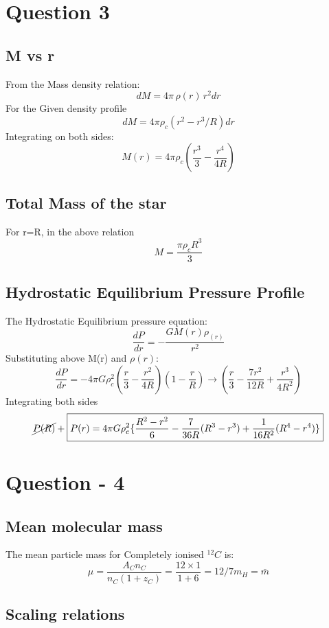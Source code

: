 \documentclass[11pt]{article}
\begin{document}
	\section{\color{teal} Question 3}
	
	\subsection{M vs r}
	
	From the Mass density relation:
	\[
		dM = 4\pi \, \rho(r)\,  r^2 dr
	\]
	For the Given density profile
	\[
		dM =4\pi\rho_c(r^2 - r^3/R)dr
	\]
	Integrating on both sides:
	\[
		\boxed{M(r) = 4\pi\rho_c (\frac{r^3}{3} -\frac{r^4}{4R})}
	\]
	\subsection{Total Mass of the star}
	
	For r=R, in the above relation
	\[
		\boxed{M = \frac{\pi\rho_cR^3}{3}}
	\]
	\subsection{Hydrostatic Equilibrium Pressure Profile}
	
	The Hydrostatic Equilibrium pressure equation:
	\[
		\frac{dP}{dr}  = -\frac{GM(r)\rho_(r)}{r^2}
	\]
	Substituting above M(r) and $\rho(r)$:
	\[
		\frac{dP}{dr} = -4\pi G \rho_c^2 (\frac{r}{3} - \frac{r^2}{4R})(1-\frac{r}{R}) \rightarrow (\frac{r}{3} -\frac{7r^2}{12R} + \frac{r^3}{4R^2})
	\]
	Integrating both sides
	\[
		\cancel{P(R)} + \boxed{P(r) = 4\pi G \rho_c^2 \{\frac{R^2-r^2}{6} - \frac{7}{36R}(R^3-r^3) + \frac{1}{16R^2}(R^4-r^4)\}}
	\]
	
	\section{\color{teal}Question - 4}
	
	\subsection{Mean molecular mass}
	The mean particle mass for Completely ionised $^{12}C$ is: 
	\[
		\mu = \frac{ A_C n_C}{n_C(1+z_C)} = \frac{12\times 1}{ 1+6} = \boxed{12/7 m_H=\bar{m} }	
	\]
	
	\subsection{Scaling relations}
	
\end{document}
